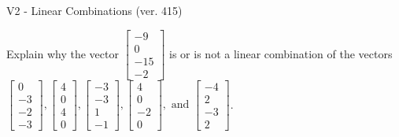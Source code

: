 \begin{exercise}
  \begin{exerciseTitle}V2 - Linear Combinations (ver. 415)\end{exerciseTitle}
  \begin{exerciseStatement}
    Explain why the vector \(\left[\begin{array}{c}
-9 \\
0 \\
-15 \\
-2
\end{array}\right]\)  is or is not a linear 
	combination of the vectors \(\left[\begin{array}{c}
0 \\
-3 \\
-2 \\
-3
\end{array}\right] , \left[\begin{array}{c}
4 \\
0 \\
4 \\
0
\end{array}\right] , \left[\begin{array}{c}
-3 \\
-3 \\
1 \\
-1
\end{array}\right] , \left[\begin{array}{c}
4 \\
0 \\
-2 \\
0
\end{array}\right] , \text{ and } \left[\begin{array}{c}
-4 \\
2 \\
-3 \\
2
\end{array}\right]\).
	



\end{exerciseStatement}
\end{exercise}
